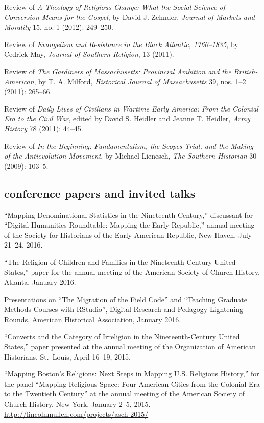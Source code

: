 \documentclass[11pt]{article}
\begin{document}
Review of \emph{A Theology of Religious Change: What the Social Science
  of Conversion Means for the Gospel}, by David J. Zehnder, \emph{Journal
  of Markets and Morality} 15, no. 1 (2012): 249--250.

Review of \emph{Evangelism and Resistance in the Black Atlantic,
  1760--1835}, by Cedrick May, \emph{Journal of Southern Religion}, 13
(2011).

Review of \emph{The Gardiners of Massachusetts: Provincial Ambition and
  the British-American}, by T. A. Milford, \emph{Historical Journal of
  Massachusetts} 39, nos. 1--2 (2011): 265--66.

Review of \emph{Daily Lives of Civilians in Wartime Early America: From
  the Colonial Era to the Civil War}, edited by David S. Heidler and
Jeanne T. Heidler, \emph{Army History} 78 (2011): 44--45.

Review of \emph{In the Beginning: Fundamentalism, the Scopes Trial, and
  the Making of the Antievolution Movement}, by Michael Lienesch,
\emph{The Southern Historian} 30 (2009): 103--5.

\subsection{conference papers and invited 
  talks}\label{conference-papers-invited-talks}

``Mapping Denominational Statistics in the Nineteenth Century,'' discussant 
for ``Digital Humanities Roundtable: Mapping the Early Republic,'' annual 
meeting of the Society for Historians of the Early American Republic, New 
Haven, July 21--24, 2016.

``The Religion of Children and Families in the Nineteenth-Century United 
States,'' paper for the annual meeting of the American Society of 
Church History, Atlanta, January 2016.

Presentations on ``The Migration of the Field Code'' and ``Teaching 
Graduate Methods Courses with RStudio'', Digital Research and Pedagogy 
Lightening Rounds, American Historical Association, January 2016.

``Converts and the Category of Irreligion in the Nineteenth-Century
United States,'' paper presented at the annual meeting of the
Organization of American Historians, St.~Louis, April 16--19, 2015.

``Mapping Boston's Religions: Next Steps in Mapping U.S. Religious History,'' 
for the panel ``Mapping Religious Space: Four American Cities from the 
Colonial Era to the Twentieth Century'' at the annual meeting of the American 
Society of Church History, New York, January 2--5, 2015.  
\url{http://lincolnmullen.com/projects/asch-2015/}
\end{document}
